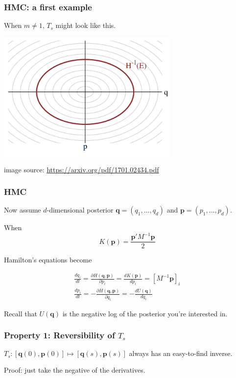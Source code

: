 \documentclass{beamer}
\begin{document}
\begin{frame}
\frametitle{HMC: a first example}

When $m \neq 1$, $T_s$ might look like this. 
\begin{center}
\includegraphics[width=90mm]{level_sets.png}
\end{center}
image source: \url{https://arxiv.org/pdf/1701.02434.pdf}

\end{frame}

\begin{frame}
\frametitle{HMC}

Now assume $d$-dimensional posterior $\mathbf{q} = (q_1, \ldots, q_d)$ and $\mathbf{p} = (p_1, \ldots, p_d)$.
\newline

When
$$
K(\mathbf{p}) = \frac{\mathbf{p}'M^{-1}\mathbf{p}}{2} 
$$

Hamilton's equations become

\begin{gather}
\frac{dq_i}{dt} = \frac{\partial H(\mathbf{q},\mathbf{p})}{\partial p_i} =  \frac{d K(\mathbf{p}) }{d p_i} = [M^{-1}\mathbf{p}]_i  \\
\frac{dp_i}{dt} = -\frac{\partial H(\mathbf{q},\mathbf{p})}{\partial q_i} = -\frac{d U(\mathbf{q})}{d q_i} 
\end{gather}

Recall that $U(\mathbf{q})$ is the negative log of the posterior you're interested in.
\end{frame}


\begin{frame}
\frametitle{Property 1: Reversibility of $T_s$}

$T_s: [\mathbf{q}(0), \mathbf{p}(0)] \mapsto [\mathbf{q}(s), \mathbf{p}(s)]$ always has an easy-to-find inverse.
\newline

Proof: just take the negative of the derivatives.


\end{frame}
\end{document}
